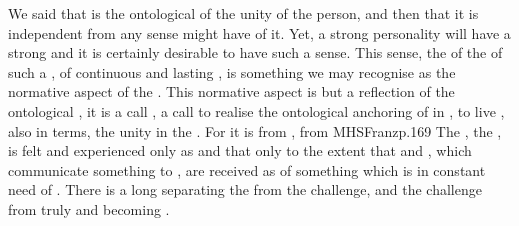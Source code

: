 \pa We said that  is the ontological  of the unity of
the person, and then
that it is independent from any sense  might have of it.  Yet, a
strong personality will have a strong  and it is certainly
desirable to have such a sense.  This sense, the  of the
 of such a , of continuous and lasting ,
is something we may recognise as the normative aspect of the . This
normative aspect is but a reflection of the ontological , it is a
call , a call to  realise the ontological
anchoring of  in , to live , also in
 terms, the unity  in the .  For it is from
, from \citet{this central nucleus (as far as we know today), [that]
  the whole building up of ego consciousness is directed, the ego apparently
  being a duplicate or structural counterpart of the original
  center.}{MHSFranz}{p.169} 
The , the , is felt and experienced only as
 and that only to the extent that  and
, which communicate something to , are received as
 of something which is in constant need of
.  There is a long  separating the  from the  challenge, and the  challenge
from truly and  becoming .

